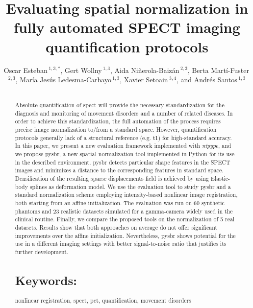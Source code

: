 \documentclass{frontiers}
\def\firstAuthorLast{Esteban {et~al}} %
\def\Authors{Oscar Esteban\,$^{1,3,*}$, 
             Gert Wollny\,$^{1,3}$, 
             Aida Ni\~nerola-Baiz\'an\,$^{2,3}$, 
             Berta Mart\'i-Fuster\,$^{2,3}$,
             Mar\'ia Jes\'us Ledesma-Carbayo\,$^{1,3}$, 
             Xavier Setoain\,$^{3,4}$, and 
             Andr\'es Santos\,$^{1,3}$}
\begin{document}
\onecolumn
{}

\title[Evaluating normalization]%
  {Evaluating spatial normalization in fully automated SPECT imaging quantification protocols}

\author[\firstAuthorLast ]{\Authors}
\address{}
\correspondance{}
\editor{}

\maketitle


\begin{abstract}
\section{}
Absolute quantification of \gls*{spect} will
  provide the necessary standardization for the diagnosis and monitoring
  of movement disorders and a number of related diseases.
In order to achieve this standardization, the full automation of the
  process requires precise image normalization to/from a standard space.
However, quantification protocols generally lack of a structural reference
  (e.g. \acrlong{t1}) for high-standard accuracy.
In this paper, we present a new evaluation framework implemented with \emph{nipype},
  and we propose \gls*{pysbr}, a new spatial normalization tool implemented in Python for 
  its use in the described environment.
\gls*{pysbr} detects particular shape features in the SPECT images and
  minimizes a distance to the corresponding features in standard space.
Densification of the resulting sparse displacements field is achieved by using
  Elastic-body splines as deformation model.
We use the evaluation tool to study \gls*{pysbr} and a standard normalization
  scheme employing intensity-based nonlinear image registration, both starting 
  from an affine initialization. 
The evaluation was run on 60 synthetic  phantoms and 23 realistic datasets simulated 
  for a gamma-camera widely used in the clinical routine.
Finally, we compare the proposed tools on the normalization of 5 real datasets.
Results show that both approaches on average do not offer significant improvements over 
  the affine initialization.
Nevertheless, \gls*{pysbr} shows potential for the use in a different
  imaging settings with better signal-to-noise ratio that justifies its further development.


\tiny
  \section{Keywords:} nonlinear registration, spect, pet, quantification, movement disorders
\end{abstract}
\end{document}
